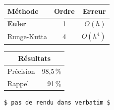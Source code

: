 \documentclass{article}
\begin{document}
\begin{tabular}{|l|c|r|}
  \hline
  Méthode & Ordre & Erreur \\
  \hline
  \textbf{Euler} & 1 & $O(h)$ \\
  Runge-Kutta & 4 & $O(h^4)$ \\
  \hline
\end{tabular}

\begin{tabular}{@{}lr@{}}
  \toprule
  \multicolumn{2}{c}{Résultats} \\
  \midrule
  Précision & 98,5\,\% \\
  Rappel & 91\,\% \\
  \bottomrule
\end{tabular}




\begin{verbatim}
$ pas de rendu dans verbatim $
\end{verbatim}
\end{document}
